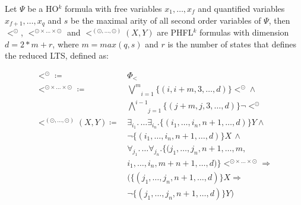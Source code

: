 \begin{definition}
    \label{definition:lower_bound_less_second}
    Let $\Psi$ be a HO$^k$ formula with free variables $x_1, \dots, x_f$ and quantified variables $x_{f+1}, \dots,
    x_q$ and $s$ be the maximal arity of all second order variables of $\Psi$, then $<^\odot$, $<^{\odot \times \dots
    \times \odot}$ and $<^{(\odot, \dots, \odot)}(X, Y)$ are PHFL$^k$ formulas with dimension $d = 2 * m + r$, where $m =
    max({q, s})$ and $r$ is the number of states that defines the reduced LTS, defined as:

    \begin{align*}
        <^\odot \coloneqq &\,\Phi_< \\
        <^{\odot \times \dots \times \odot} \coloneqq
            &\,\underset{i = 1}{\overset{m}{\bigvee}}\{(i, i + m, 3, \dots, d)\} <^\odot \wedge \\
            &\,\underset{j = 1}{\overset{i - 1}{\bigwedge}}\{(j + m, j, 3, \dots, d)\} \neg <^\odot \\
        <^{(\odot, \dots, \odot)}(X, Y) \coloneqq
            &\,\exists_{i_1}.\, \dots \exists_{i_n}. \{(i_1, \dots, i_n, n + 1,\dots, d)\}Y \wedge \\
            &\,\neg \{(i_1, \dots, i_n, n + 1, \dots, d)\} X\,\wedge \\
            &\, \forall_{j_1}. \,\dots \forall_{j_n}. \{(j_1, \dots, j_n, n+1, \dots, m, \\
            &\,i_1, \dots, i_n, m + n + 1, \dots, d)\}<^{\odot \times \dots \times \odot} \Rightarrow \\
            &\,(\{(j_1,\dots, j_n, n + 1, \dots, d)\} X \Rightarrow \\
            &\,\neg \{(j_1, \dots, j_n, n + 1, \dots, d)\} Y)
    \end{align*}
\end{definition}

